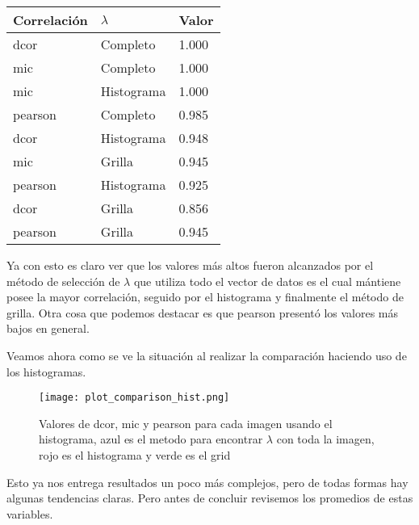    \begin{table}[H]
        \centering
        \begin{tabular}{|l|l|l|}
            \hline
        Correlaci\'on    & $\lambda$ & Valor  \\    \hline
        dcor    & Completo    & 1.000  \\
        mic     & Completo    & 1.000  \\
        mic     & Histograma  & 1.000  \\
        pearson & Completo    & 0.985 \\
        dcor    & Histograma  & 0.948 \\
        mic     & Grilla      & 0.945  \\
        pearson & Histograma  & 0.925  \\
        dcor    & Grilla      & 0.856  \\
        pearson & Grilla      & 0.945  \\     \hline

        \end{tabular}
    \end{table}

    Ya con esto es claro ver que los valores m\'as altos fueron alcanzados por el m\'etodo de selecci\'on de  $\lambda$ que utiliza todo el vector de datos es el cual m\'antiene posee la mayor correlaci\'on, seguido por el histograma y finalmente el m\'etodo de grilla. Otra cosa que podemos destacar es que pearson present\'o los valores m\'as bajos en general.

    Veamos ahora como se ve la situaci\'on al realizar la comparaci\'on haciendo uso de los histogramas.

    \begin{figure}[H]
        \centering
        \texttt{[image: plot\_comparison\_hist.png]}
        \caption{Valores de dcor, mic y pearson para cada imagen usando el histograma, azul es el metodo para encontrar $\lambda$ con toda la imagen, rojo es el histograma y verde es el grid}
    \end{figure}

    Esto ya nos entrega resultados un poco m\'as complejos, pero de todas formas hay algunas tendencias claras. Pero antes de concluir revisemos los promedios de estas variables.

